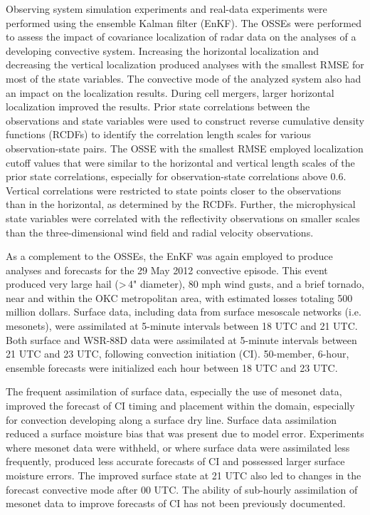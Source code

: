 \begin{preface}

\tableofcontents
\listoftables
\listoffigures
{}
Observing system simulation experiments and real-data experiments were performed using the ensemble Kalman filter (EnKF). The OSSEs were performed to assess the impact of covariance localization of radar data on the analyses of a developing convective system. Increasing the horizontal localization and decreasing the vertical localization produced analyses with the smallest RMSE for most of the state variables. The convective mode of the analyzed system also had an impact on the localization results. During cell mergers, larger horizontal localization improved the results. Prior state correlations between the observations and state variables were used to construct reverse cumulative density functions (RCDFs) to identify the correlation length scales for various observation-state pairs. The OSSE with the smallest RMSE employed localization cutoff values that were similar to the horizontal and vertical length scales of the prior state correlations, especially for observation-state correlations above 0.6. Vertical correlations were restricted to state points closer to the observations than in the horizontal, as determined by the RCDFs. Further, the microphysical state variables were correlated with the reflectivity observations on smaller scales than the three-dimensional wind field and radial velocity observations.

As a complement to the OSSEs, the EnKF was again employed to produce analyses and forecasts for the 29 May 2012 convective episode. This event produced very large hail (\textgreater\,4" diameter), 80 mph wind gusts, and a brief tornado, near and within the OKC metropolitan area, with estimated losses totaling 500 million dollars. Surface data, including data from surface mesoscale networks (i.e. mesonets), were assimilated at 5-minute intervals between 18 UTC and 21 UTC. Both surface and WSR-88D data were assimilated at 5-minute intervals between 21 UTC and 23 UTC, following convection initiation (CI). 50-member, 6-hour, ensemble forecasts were initialized each hour between 18 UTC and 23 UTC.

The frequent assimilation of surface data, especially the use of mesonet data, improved the forecast of CI timing and placement within the domain, especially for convection developing along a surface dry line. Surface data assimilation reduced a surface moisture bias that was present due to model error. Experiments where mesonet data were withheld, or where surface data were assimilated less frequently, produced less accurate forecasts of CI and possessed larger surface moisture errors. The improved surface state at 21 UTC also led to changes in the forecast convective mode after 00 UTC. The ability of sub-hourly assimilation of mesonet data to improve forecasts of CI has not been previously documented.


\end{preface}
